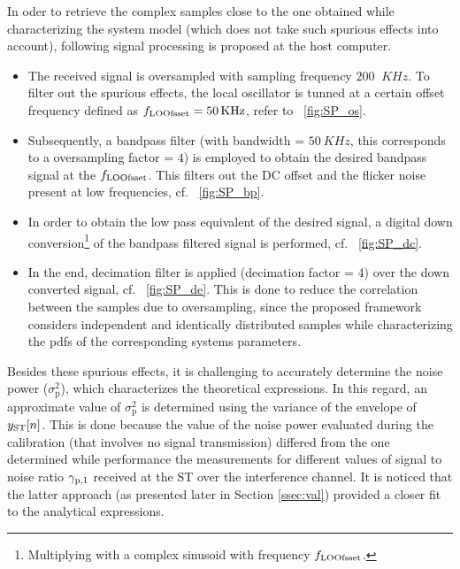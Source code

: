 In oder to retrieve the complex samples close to the one obtained while characterizing the system model (which does not take such spurious effects into account), following signal processing is proposed at the host computer.\begin{itemize}
\item The received signal is oversampled with sampling frequency $200$ $\SI{}{KHz}$. 
To filter out the spurious effects, the local oscillator is tunned at a certain offset frequency defined as $f_{\text{LOOfsset}} = \SI{50}{KHz}$, refer to \figurename~\ref{fig:SP_os}. 
\item Subsequently, a bandpass filter (with bandwidth = $\SI{50}{KHz}$, this corresponds to a oversampling factor = $4$) is employed to obtain the desired bandpass signal at the $f_{\text{LOOfsset}}$. This filters out the DC offset and the flicker noise present at low frequencies, cf. \figurename~\ref{fig:SP_bp}. 
\item In order to obtain the low pass equivalent of the desired signal, a digital down conversion\footnote{Multiplying with a complex sinusoid with frequency $f_{\text{LOOfsset}}$.} of the bandpass filtered signal is performed, cf. \figurename~\ref{fig:SP_dc}. %
\item In the end, decimation filter is applied (decimation factor = 4) over the down converted signal, cf. \figurename~\ref{fig:SP_de}. This is done to reduce the correlation between the samples due to oversampling, since the proposed framework considers independent and identically distributed samples while characterizing the pdfs of the corresponding systems parameters. 
\end{itemize}

Besides these spurious effects, it is challenging to accurately determine the noise power ($\sigma_\textrm{p}^2$), which characterizes the theoretical expressions. In this regard, an approximate value of $\sigma_\textrm{p}^2$ is determined using the variance of the envelope of $y_{\text{ST}}[n]$. This is done because the value of the noise power evaluated during the calibration (that involves no signal transmission) differed from the one determined while performance the measurements for different values of signal to noise ratio ${\gamma}_{\text{p,1}}$ received at the ST over the interference channel. It is noticed that the latter approach (as presented later in Section \ref{ssec:val}) provided a closer fit to the analytical expressions.

